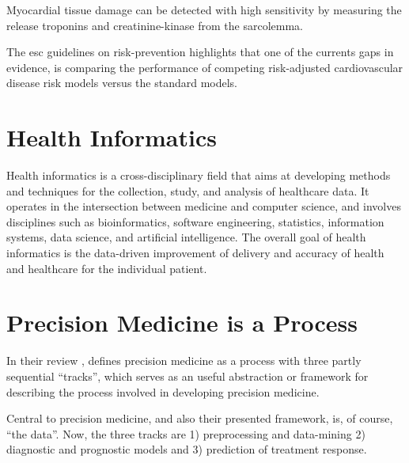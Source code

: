 
Myocardial tissue damage can be detected with high sensitivity by measuring 
the release troponins and creatinine-kinase from the sarcolemma.
~\autocite{falkPathogenesis2006}

The esc guidelines on risk-prevention highlights 
that one of the currents gaps in evidence,
is comparing the performance of competing risk-adjusted 
cardiovascular disease risk models versus the standard models.
~\autocite{visseren20212021}




\section{Health Informatics}

Health informatics is a cross-disciplinary field
that aims at developing methods and techniques
for the collection, study, and analysis of healthcare data.
It operates in the intersection between medicine and computer science,
and involves disciplines such as
bioinformatics, software engineering, statistics, information systems,
data science, and artificial intelligence.
The overall goal of health informatics is the data-driven improvement
of delivery and accuracy of health and healthcare for the individual patient.

\section{Precision Medicine is a Process}

In their review 
, 
\citeauthor{konigWhat2017} defines precision medicine as 
a process with three partly sequential \enquote{tracks},
which serves as an useful abstraction or framework 
for describing the process involved in developing precision medicine.
~\autocite{konigWhat2017} 



Central to precision medicine, and also their presented framework,
is, of course, \enquote{the data}. 
Now, the three tracks are
1) preprocessing and data-mining
2) diagnostic and prognostic models
and 3) prediction of treatment response.





